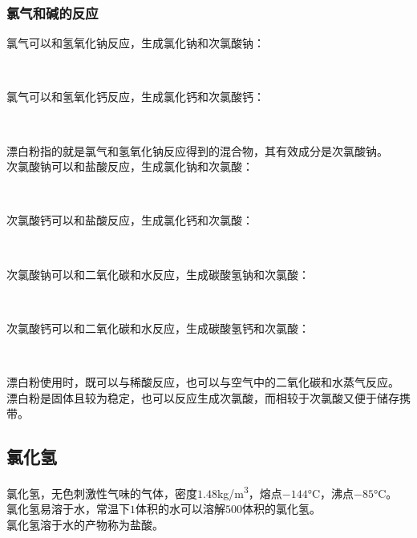 \documentclass[UTF8]{ctexart}
\begin{document}
\subsubsection{氯气和碱的反应}
    氯气可以和氢氧化钠反应，生成氯化钠和次氯酸钠：
    \begin{center}
        \\[6mm]
    \end{center}
    氯气可以和氢氧化钙反应，生成氯化钙和次氯酸钙：
    \begin{center}
        \\[6mm]
    \end{center}
    漂白粉指的就是氯气和氢氧化钠反应得到的混合物，其有效成分是次氯酸钠。\\[9mm]
    次氯酸钠可以和盐酸反应，生成氯化钠和次氯酸：
    \begin{center}
        \\[6mm]
    \end{center}
    次氯酸钙可以和盐酸反应，生成氯化钙和次氯酸：
    \begin{center}
        \\[6mm]
    \end{center}
    次氯酸钠可以和二氧化碳和水反应，生成碳酸氢钠和次氯酸：
    \begin{center}
        \\[6mm]
    \end{center}
    次氯酸钙可以和二氧化碳和水反应，生成碳酸氢钙和次氯酸：
    \begin{center}
        \\[6mm]
    \end{center}
    漂白粉使用时，既可以与稀酸反应，也可以与空气中的二氧化碳和水蒸气反应。\\[3mm]
    漂白粉是固体且较为稳定，也可以反应生成次氯酸，而相较于次氯酸又便于储存携带。

\newpage

\subsection{氯化氢}
    氯化氢，无色刺激性气味的气体，密度$1.48$\si{kg/m^3}，熔点$-144$\si{\degreeCelsius}，沸点$-85$\si{\degreeCelsius}。\\[3mm]
    氯化氢易溶于水，常温下$1$体积的水可以溶解$500$体积的氯化氢。\\[3mm]
    氯化氢溶于水的产物称为盐酸。
\end{document}
